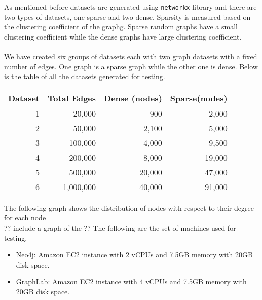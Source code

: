 As mentioned before datasets are generated using \texttt{networkx} library and there are two types of datasets, one sparse and two dense. Sparsity is measured based on the clustering coefficient of the graphg. Sparse random graphs have a small clustering coefficient while the dense graphs have large clustering coefficient.\\
\\
We have created six groups of datasets each with two graph datasets with a fixed number of edges. One graph is a sparse graph while the other one is dense. Below is the table of all the datasets generated for testing.
\begin{table}[h]
\centering
	\begin{tabular}{|r|r|r|r|}
		\hline
		\multicolumn{1}{|c|}{Dataset} & \multicolumn{1}{c|}{Total Edges} & \multicolumn{1}{c|}{Dense (nodes)} & \multicolumn{1}{c|}{Sparse(nodes)} \\ \hline
		1                             & 20,000                           & 900                                & 2,000                              \\ \hline
		2                             & 50,000                           & 2,100                              & 5,000                              \\ \hline
		3                             & 100,000                          & 4,000                              & 9,500                              \\ \hline
		4                             & 200,000                          & 8,000                              & 19,000                             \\ \hline
		5                             & 500,000                          & 20,000                             & 47,000                             \\ \hline
		6                             & 1,000,000                        & 40,000                             & 91,000                             \\ \hline
	\end{tabular}
\end{table}
The following graph shows the distribution of nodes with respect to their degree for each node\\
?? include a graph of the ??
The following are the set of machines used for testing. 
\begin{itemize}
	\item
	Neo4j: Amazon EC2 instance with 2 vCPUs and 7.5GB memory with 20GB disk space.
	\item
	GraphLab: Amazon EC2 instance with 4 vCPUs and 7.5GB memory with 20GB disk space.
\end{itemize}
